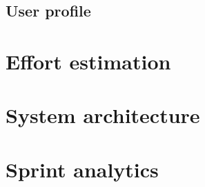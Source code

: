 \documentclass[11pt, a4paper]{article}
\begin{document}
\subsection{User profile}
\begin{figure}[H]
    \centering
\end{figure}


\newpage

\section{Effort estimation}


\newpage

\section{System architecture}


\newpage

\section{Sprint analytics}
\end{document}
